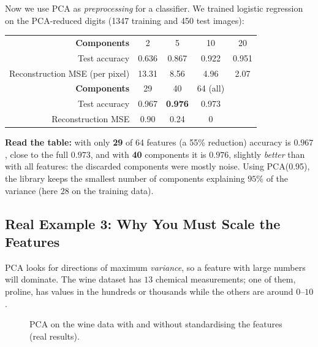 Now we use PCA as \emph{preprocessing} for a classifier. We trained logistic regression on the PCA-reduced digits (1347 training and 450 test images):

\begin{center}
\begin{tabular}{@{}rcccc@{}}
\toprule
\textbf{Components} & 2 & 5 & 10 & 20\\
Test accuracy & 0.636 & 0.867 & 0.922 & 0.951\\
Reconstruction MSE (per pixel) & 13.31 & 8.56 & 4.96 & 2.07\\
\midrule
\textbf{Components} & 29 & 40 & 64 (all) & \\
Test accuracy & 0.967 & \textbf{0.976} & 0.973 & \\
Reconstruction MSE & 0.90 & 0.24 & 0 & \\
\bottomrule
\end{tabular}
\end{center}

\noindent \textbf{Read the table:} with only \textbf{29} of 64 features (a 55\% reduction) accuracy is $0.967$, close to the full $0.973$, and with \textbf{40} components it is $0.976$, slightly \emph{better} than with all features: the discarded components were mostly noise. Using PCA(0.95), the library keeps the smallest number of components explaining $95\%$ of the variance (here $28$ on the training data).

\subsection{Real Example 3: Why You Must Scale the Features}

PCA looks for directions of maximum \emph{variance}, so a feature with large numbers will dominate. The wine dataset has $13$ chemical measurements; one of them, proline, has values in the hundreds or thousands while the others are around $0$--$10$.

\begin{figure}[!htbp]
\centering
{}
\caption{PCA on the wine data with and without standardising the features (real results).}\label{fig:winescale}
\end{figure}

